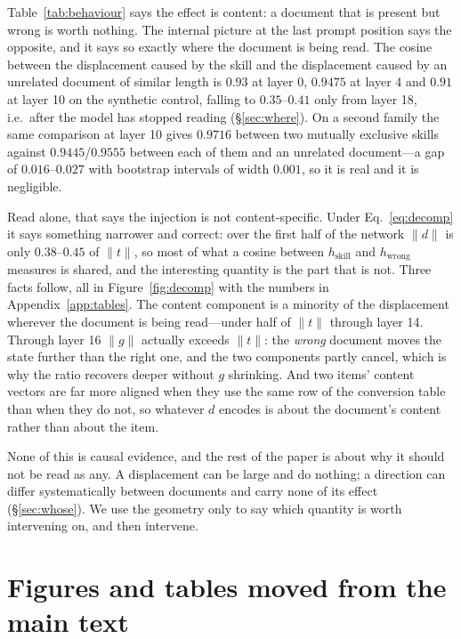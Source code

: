 \documentclass{article}
\newcommand{\dvec}{\ensuremath{d}}
\newcommand{\gvec}{\ensuremath{g}}
\newcommand{\tvec}{\ensuremath{t}}
\begin{document}
Table~\ref{tab:behaviour} says the effect is content: a document that is present
but wrong is worth nothing. The internal picture at the last prompt position says
the opposite, and it says so exactly where the document is being read. The cosine
between the displacement caused by the skill and the displacement caused by an
unrelated document of similar length is $0.93$ at layer 0, $0.9475$ at layer 4
and $0.91$ at layer 10 on the synthetic control, falling to $0.35$--$0.41$ only
from layer 18, i.e.\ after the model has stopped reading (\S\ref{sec:where}). On
a second family the same comparison at layer 10 gives $0.9716$ between two
mutually exclusive skills against $0.9445$/$0.9555$ between each of them and an
unrelated document---a gap of $0.016$--$0.027$ with bootstrap intervals of width
$0.001$, so it is real and it is negligible.

Read alone, that says the injection is not content-specific. Under
Eq.~\ref{eq:decomp} it says something narrower and correct: over the first half
of the network $\|\dvec\|$ is only $0.38$--$0.45$ of $\|\tvec\|$, so most of what
a cosine between $h_{\text{skill}}$ and $h_{\text{wrong}}$ measures is shared,
and the interesting quantity is the part that is not. Three facts follow, all in
Figure~\ref{fig:decomp} with the numbers in Appendix~\ref{app:tables}. The
content component is a minority of the displacement wherever the document is
being read---under half of $\|\tvec\|$ through layer 14. Through layer 16
$\|\gvec\|$ actually exceeds $\|\tvec\|$: the \emph{wrong} document moves the
state further than the right one, and the two components partly cancel, which is
why the ratio recovers deeper without $\gvec$ shrinking. And two items' content
vectors are far more aligned when they use the same row of the conversion table
than when they do not, so whatever $\dvec$ encodes is about the document's
content rather than about the item.



None of this is causal evidence, and the rest of the paper is about why it
should not be read as any. A displacement can be large and do nothing; a
direction can differ systematically between documents and carry none of its
effect (\S\ref{sec:whose}). We use the geometry only to say which quantity is worth
intervening on, and then intervene.


\clearpage

\section{Figures and tables moved from the main text}
\label{app:moved}
\end{document}
